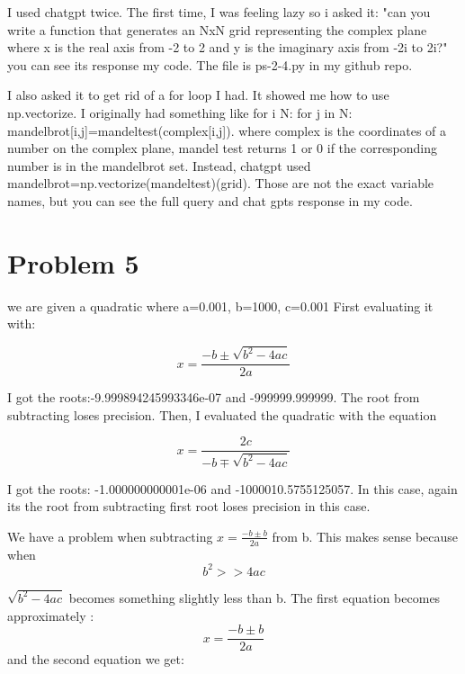 \documentclass[11pt]{article}
\begin{document}
I used chatgpt twice. The first time, I was feeling lazy so i asked it: "can you write a function that generates an NxN grid representing the complex plane where x is the real axis from -2 to 2 and y is the imaginary axis from -2i to 2i?"
you can see its response my code. The file is ps-2-4.py in my github repo.

I also asked it to get rid of a for loop I had. It showed me how to use np.vectorize. I originally had something like for i N: for j in N: mandelbrot[i,j]=mandeltest(complex[i,j]). where complex is the coordinates of a number on the complex plane, mandel test returns 1 or 0 if the corresponding number is in the mandelbrot set. Instead, chatgpt used mandelbrot=np.vectorize(mandeltest)(grid). Those are not the exact variable names, but you can see the full query and chat gpts response in my code.


\section{Problem 5}


we are given a quadratic where a=0.001, b=1000, c=0.001
First evaluating it with:

\begin{equation}
    x = \frac{-b \pm \sqrt{b^2 - 4ac}}{2a}
\end{equation}

I got the roots:-9.999894245993346e-07 and -999999.999999. The root from subtracting loses precision. Then, I evaluated the quadratic with the equation

\begin{equation}
    x = \frac{2c}{-b \mp \sqrt{b^2 - 4ac}}
\end{equation}

I got the roots: -1.000000000001e-06 and -1000010.5755125057. In this case, again its the root from subtracting first root loses precision in this case.
\par
We have a problem when subtracting $x = \frac{-b \pm b}{2a}$ from b. This makes sense because when
\begin{equation}
    b^2 >> 4ac
\end{equation}

 $\sqrt{b^2 - 4ac}$ becomes something slightly less than b.
The first equation becomes approximately :
\begin{equation}
    x = \frac{-b \pm b}{2a}
\end{equation}
and the second equation we get:
    
\end{document}
